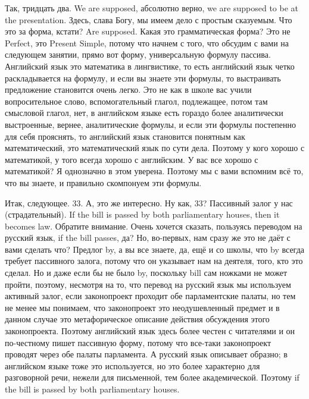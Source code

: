 \documentclass[main.tex]{subfiles}
\begin{document}
Так, тридцать два.
We are supposed, абсолютно верно, we are supposed to be at the presentation.
Здесь, слава Богу, мы имеем дело с простым сказуемым.
Что это за форма, кстати? Are supposed.
Какая это грамматическая форма?
Это не Perfect, это Present Simple, потому что начнем с того, что обсудим с вами на следующем занятии, прямо вот форму, универсальную формулу пассива.
Английский язык это математика в лингвистике, то есть английский язык четко раскладывается на формулу, и если вы знаете эти формулы, то выстраивать предложение становится очень легко.
Это не как в школе вас учили вопросительное слово, вспомогательный глагол, подлежащее, потом там смысловой глагол, нет, в английском языке есть гораздо более аналитически выстроенные, вернее, аналитические формулы, и если эти формулы постепенно для себя прояснять, то английский язык становится понятным как математический, это математический язык по сути дела.
Поэтому у кого хорошо с математикой, у того всегда хорошо с английским.
У вас все хорошо с математикой? Я однозначно в этом уверена.
Поэтому мы с вами вспомним всё то, что вы знаете, и правильно скомпонуем эти формулы.

Итак, следующее. 33.
А, это же интересно.
Ну как, 33? Пассивный залог у нас (страдательный).
If the bill is passed by both parliamentary houses, then it becomes law.
Обратите внимание.
Очень хочется сказать, пользуясь переводом на русский язык, if the bill passes, да? Но, во-первых, нам сразу же это не даёт с вами сделать что? Предлог by, а вы все знаете, да, ещё и со школы, что by всегда требует пассивного залога, потому что он указывает нам на деятеля, того, кто это сделал.
Но и даже если бы не было by, поскольку bill сам ножками не может пройти, поэтому, несмотря на то, что перевод на русский язык мы используем активный залог, если законопроект проходит обе парламентские палаты, но тем не менее мы понимаем, что законопроект это неодушевленный предмет и в данном случае это метафорическое описание действия обсуждения этого законопроекта.
Поэтому английский язык здесь более честен с читателями и он по-честному пишет пассивную форму, потому что все-таки законопроект проводят через обе палаты парламента.
А русский язык описывает образно; в английском языке тоже это используется, но это более характерно для разговорной речи, нежели для письменной, тем более академической.
Поэтому if the bill is passed by both parliamentary houses.
\end{document}
